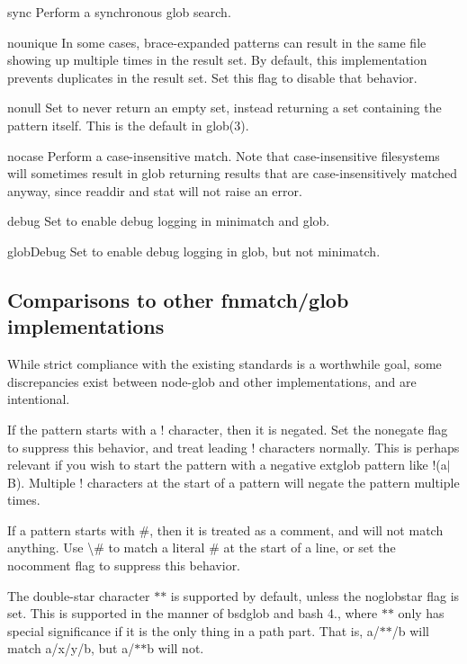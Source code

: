 \begin{DoxyItemize}
\item {\ttfamily sync} Perform a synchronous glob search.
\item {\ttfamily nounique} In some cases, brace-\/expanded patterns can result in the same file showing up multiple times in the result set. By default, this implementation prevents duplicates in the result set. Set this flag to disable that behavior.
\item {\ttfamily nonull} Set to never return an empty set, instead returning a set containing the pattern itself. This is the default in glob(3).
\item {\ttfamily nocase} Perform a case-\/insensitive match. Note that case-\/insensitive filesystems will sometimes result in glob returning results that are case-\/insensitively matched anyway, since readdir and stat will not raise an error.
\item {\ttfamily debug} Set to enable debug logging in minimatch and glob.
\item {\ttfamily glob\+Debug} Set to enable debug logging in glob, but not minimatch.
\end{DoxyItemize}

\subsection*{Comparisons to other fnmatch/glob implementations}

While strict compliance with the existing standards is a worthwhile goal, some discrepancies exist between node-\/glob and other implementations, and are intentional.

If the pattern starts with a {\ttfamily !} character, then it is negated. Set the {\ttfamily nonegate} flag to suppress this behavior, and treat leading {\ttfamily !} characters normally. This is perhaps relevant if you wish to start the pattern with a negative extglob pattern like {\ttfamily !(a$\vert$\+B)}. Multiple {\ttfamily !} characters at the start of a pattern will negate the pattern multiple times.

If a pattern starts with {\ttfamily \#}, then it is treated as a comment, and will not match anything. Use {\ttfamily \textbackslash{}\#} to match a literal {\ttfamily \#} at the start of a line, or set the {\ttfamily nocomment} flag to suppress this behavior.

The double-\/star character {\ttfamily $\ast$$\ast$} is supported by default, unless the {\ttfamily noglobstar} flag is set. This is supported in the manner of bsdglob and bash 4., where {\ttfamily $\ast$$\ast$} only has special significance if it is the only thing in a path part. That is, {\ttfamily a/$\ast$$\ast$/b} will match {\ttfamily a/x/y/b}, but {\ttfamily a/$\ast$$\ast$b} will not.

